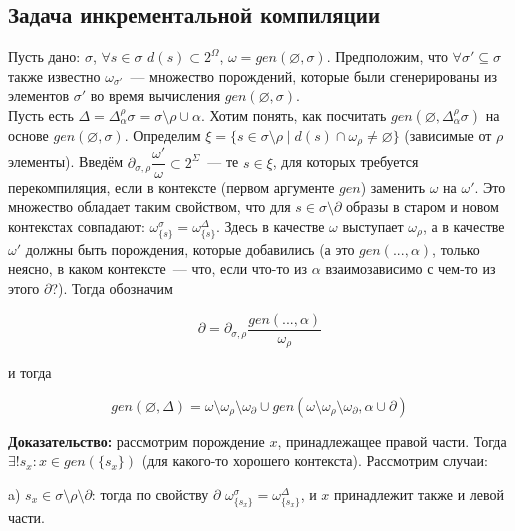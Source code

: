 



\subsection{Задача инкрементальной компиляции}

\newcommand{\Deltasigma}{\Delta_\alpha^\rho\sigma}
\newcommand{\oomega}{\overline{\omega}}

Пусть дано: $\sigma$, $\forall s \in \sigma$ $d(s) \subset 2^\Omega$, $\omega = gen(\varnothing, \sigma)$. Предположим, что $\forall \sigma' \subseteq \sigma$ также известно $\omega_{\sigma'}$~--- множество порождений, которые были сгенерированы из элементов $\sigma'$ во время вычисления $gen(\varnothing, \sigma)$.\\

Пусть есть $\Delta = \Deltasigma = \sigma\setminus\rho\cup\alpha$. Хотим понять, как посчитать $gen(\varnothing, \Deltasigma)$ на основе $gen(\varnothing, \sigma)$. Определим $\xi = \{s \in \sigma\setminus\rho \mid d(s) \cap \omega_\rho \neq \varnothing\}$ (зависимые от $\rho$ элементы). Введём $\partial_{\sigma, \rho}\dfrac{\omega'}{\omega} \subset 2^\Sigma$~--- те $s \in \xi$, для которых требуется перекомпиляция, если в контексте (первом аргументе $gen$) заменить $\omega$ на $\omega'$. Это множество обладает таким свойством, что для $s \in \sigma\setminus\partial$ образы в старом и новом контекстах совпадают: $\omega_{\{s\}}^\sigma = \omega_{\{s\}}^{\Delta}$. Здесь в качестве $\omega$ выступает $\omega_\rho$, а в качестве $\omega'$ должны быть порождения, которые добавились (а это $gen(..., \alpha)$, только неясно, в каком контексте~--- что, если что-то из $\alpha$ взаимозависимо с чем-то из этого $\partial$?). Тогда обозначим

$$\partial = \partial_{\sigma, \rho}\dfrac{gen(..., \alpha)}{\omega_\rho}$$

и тогда

$$gen(\varnothing, \Delta) = \omega \setminus \omega_\rho \setminus \omega_\partial \cup gen(\omega \setminus \omega_\rho \setminus \omega_\partial, \alpha \cup \partial)$$

\textbf{Доказательство:} рассмотрим порождение $x$, принадлежащее правой части. Тогда $\exists ! s_x : x \in gen(\{s_x\})$ (для какого-то хорошего контекста). Рассмотрим случаи:

a) $s_x \in \sigma\setminus\rho\setminus\partial$: тогда по свойству $\partial$ $\omega_{\{s_x\}}^\sigma = \omega_{\{s_x\}}^{\Delta}$, и $x$ принадлежит также и левой части.

